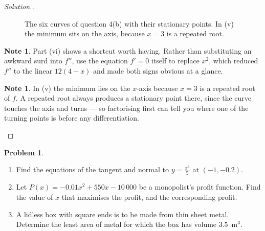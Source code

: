 \documentclass[11pt,a4paper]{article}
\theoremstyle{definition}
\newtheorem{note}[thm]{Note}
\newtheorem{problemx}{Problem}[section]
\newenvironment{problem}{\begin{problemx}}{\end{problemx}}
\newenvironment{solution}
  {\renewcommand{\qedsymbol}{}\begin{proof}[\textit{Solution}.]}
  {\end{proof}}
\begin{document}
\begin{solution}
\begin{figure}[H]
\caption{The six curves of question 4(b) with their stationary points. In (v) the minimum sits on the axis, because $x=3$ is a repeated root.}
\end{figure}

\begin{note}
Part (vi) shows a shortcut worth having. Rather than substituting an awkward surd into
$f''$, use the equation $f'=0$ itself to replace $x^2$, which reduced $f''$ to the
linear $12(4-x)$ and made both signs obvious at a glance.
\end{note}

\begin{note}
In (v) the minimum lies on the $x$-axis because $x=3$ is a repeated root of $f$. A
repeated root always produces a stationary point there, since the curve touches the axis
and turns --- so factorising first can tell you where one of the turning points is
before any differentiation.
\end{note}
\end{solution}

\begin{problem}
\begin{enumerate}
\item[(a).] Find the equations of the tangent and normal to $y=\frac{x^3}{5}$ at
$(-1,-0.2)$.
\item[(b).] Let $P(x)=-0.01x^2+550x-10\,000$ be a monopolist's profit function. Find the
value of $x$ that maximises the profit, and the corresponding profit.
\item[(c).] A lidless box with square ends is to be made from thin sheet metal.
Determine the least area of metal for which the box has volume $3.5$~m$^3$.
\end{enumerate}
\end{problem}
\end{document}
